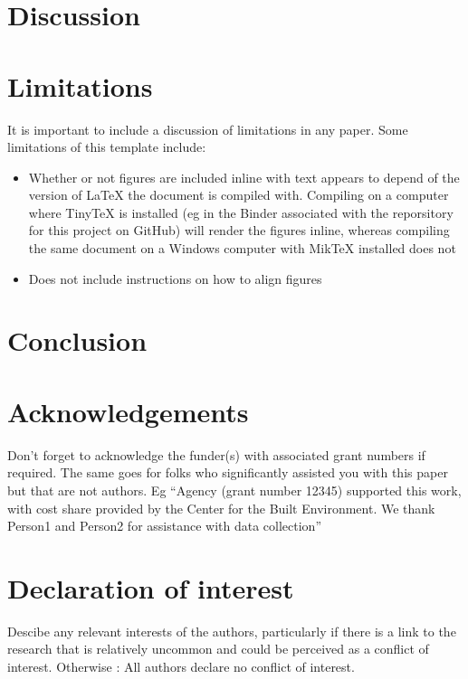 \documentclass[]{elsarticle} %
\providecommand{\tightlist}{%
  \setlength{\itemsep}{0pt}\setlength{\parskip}{0pt}}
\begin{document}
\section{Discussion}\label{discussion}

\section{Limitations}\label{limitations}

It is important to include a discussion of limitations in any paper.
Some limitations of this template include:

\begin{itemize}
\tightlist
\item
  Whether or not figures are included inline with text appears to depend
  of the version of LaTeX the document is compiled with. Compiling on a
  computer where TinyTeX is installed (eg in the Binder associated with
  the reporsitory for this project on GitHub) will render the figures
  inline, whereas compiling the same document on a Windows computer with
  MikTeX installed does not
\item
  Does not include instructions on how to align figures
\end{itemize}

\section{Conclusion}\label{conclusion}

\section{Acknowledgements}\label{acknowledgements}

Don't forget to acknowledge the funder(s) with associated grant numbers
if required. The same goes for folks who significantly assisted you with
this paper but that are not authors. Eg ``Agency (grant number 12345)
supported this work, with cost share provided by the Center for the
Built Environment. We thank Person1 and Person2 for assistance with data
collection''

\section{Declaration of interest}\label{declaration-of-interest}

Descibe any relevant interests of the authors, particularly if there is
a link to the research that is relatively uncommon and could be
perceived as a conflict of interest. Otherwise : All authors declare no
conflict of interest.
\end{document}
